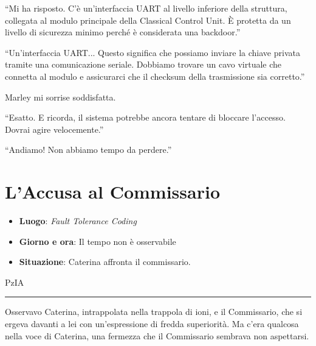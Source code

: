 \begin{dialogue}
 \enquote{Mi ha risposto. C'è un'interfaccia UART al livello inferiore della struttura, collegata al modulo principale della Classical Control Unit. È protetta da un livello di sicurezza minimo perché è considerata una backdoor.}
\end{dialogue}

\begin{dialogue}
 \enquote{Un'interfaccia UART... Questo significa che possiamo inviare la chiave privata tramite una comunicazione seriale. Dobbiamo trovare un cavo virtuale che connetta al modulo e assicurarci che il checksum della trasmissione sia corretto.}
\end{dialogue}

Marley mi sorrise soddisfatta.

\begin{dialogue}
 \enquote{Esatto. E ricorda, il sistema potrebbe ancora tentare di bloccare l'accesso. Dovrai agire velocemente.}
\end{dialogue}


\begin{dialogue}
 \enquote{Andiamo! Non abbiamo tempo da perdere.}
\end{dialogue}




\section{L'Accusa al Commissario}

\begin{tcolorbox}[colback=gray!5,colframe=gray!80,title=\textbf{Scheda Informativa}]
\begin{itemize}
    \item \textbf{Luogo}: \emph{Fault Tolerance Coding}
    \item \textbf{Giorno e ora}: Il tempo non è osservabile
    \item \textbf{Situazione}: Caterina affronta il commissario.
\end{itemize}
\end{tcolorbox}

\vspace{1em}
\begin{center}PzIA\end{center}
\hrule
\vspace{1em}

Osservavo Caterina, intrappolata nella trappola di ioni, e il Commissario, che si ergeva davanti a lei con un'espressione di fredda superiorità. Ma c'era qualcosa nella voce di Caterina, una fermezza che il Commissario sembrava non aspettarsi.

